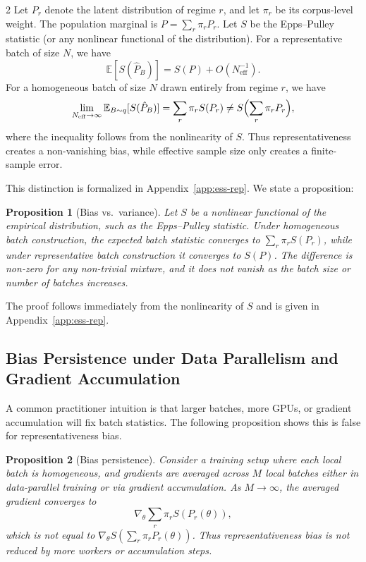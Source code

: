 \documentclass[10pt]{article}
\newtheorem{proposition}{Proposition}
\theoremstyle{remark}
\begin{document}
\begin{multicols*}{2}
Let $P_r$ denote the latent distribution of regime $r$, and let $\pi_r$ be its corpus-level weight. The population marginal is $P = \sum_r \pi_r P_r$. Let $S$ be the Epps--Pulley statistic (or any nonlinear functional of the distribution). For a representative batch of size $N$, we have
\begin{equation}
\mathbb{E}[S(\hat{P}_B)] = S(P) + O(N_{\mathrm{eff}}^{-1}).
\end{equation}
For a homogeneous batch of size $N$ drawn entirely from regime $r$, we have
\begin{equation}
\lim_{N_{\mathrm{eff}}\to\infty} \mathbb{E}_{B\sim q}[S(\hat{P}_B)] = \sum_r \pi_r S(P_r) \neq S\Bigl(\sum_r \pi_r P_r\Bigr),
\end{equation}
where the inequality follows from the nonlinearity of $S$. Thus representativeness creates a non-vanishing bias, while effective sample size only creates a finite-sample error.

This distinction is formalized in Appendix~\ref{app:ess-rep}. We state a proposition:

\begin{proposition}[Bias vs.\ variance]
\label{prop:bias}
Let $S$ be a nonlinear functional of the empirical distribution, such as the Epps--Pulley statistic. Under homogeneous batch construction, the expected batch statistic converges to $\sum_r \pi_r S(P_r)$, while under representative batch construction it converges to $S(P)$. The difference is non-zero for any non-trivial mixture, and it does not vanish as the batch size or number of batches increases.
\end{proposition}

The proof follows immediately from the nonlinearity of $S$ and is given in Appendix~\ref{app:ess-rep}.

\subsection{Bias Persistence under Data Parallelism and Gradient Accumulation}

A common practitioner intuition is that larger batches, more GPUs, or gradient accumulation will fix batch statistics. The following proposition shows this is false for representativeness bias.

\begin{proposition}[Bias persistence]
\label{prop:persist}
Consider a training setup where each local batch is homogeneous, and gradients are averaged across $M$ local batches either in data-parallel training or via gradient accumulation. As $M \to \infty$, the averaged gradient converges to
\[
\nabla_\theta \sum_r \pi_r S(P_r(\theta)),
\]
which is not equal to $\nabla_\theta S(\sum_r \pi_r P_r(\theta))$. Thus representativeness bias is not reduced by more workers or accumulation steps.
\end{proposition}


\end{multicols*}
\end{document}
